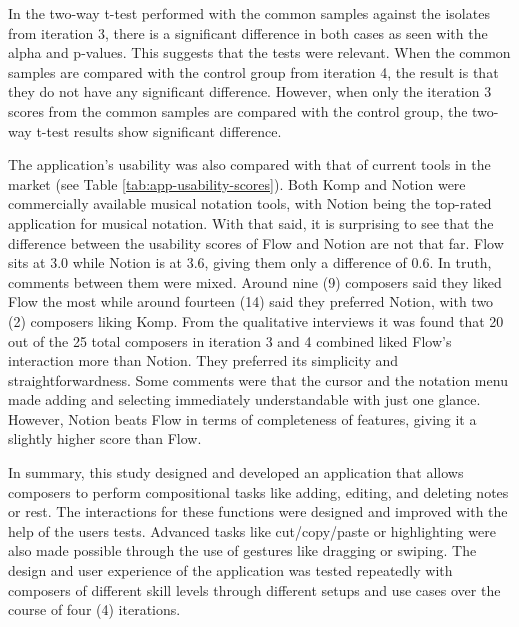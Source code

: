 		In the two-way t-test performed with the common samples against the isolates from iteration 3, there is a significant difference in both cases as seen with the alpha and p-values. This suggests that the tests were relevant. When the common samples are compared with the control group from iteration 4, the result is that they do not have any significant difference. However, when only the iteration 3 scores from the common samples are compared with the control group, the two-way t-test results show significant difference. 

		The application's usability was also compared with that of current tools in the market (see Table \ref{tab:app-usability-scores}). Both Komp and Notion were commercially available musical notation tools, with Notion being the top-rated application for musical notation. With that said, it is surprising to see that the difference between the usability scores of Flow and Notion are not that far. Flow sits at 3.0 while Notion is at 3.6, giving them only a difference of 0.6. In truth, comments between them were mixed. Around nine (9) composers said they liked Flow the most while around fourteen (14) said they preferred Notion, with two (2) composers liking Komp. From the qualitative interviews it was found that 20 out of the 25 total composers in iteration 3 and 4 combined liked Flow's interaction more than Notion. They preferred its simplicity and straightforwardness. Some comments were that the cursor and the notation menu made adding and selecting immediately understandable with just one glance. However, Notion beats Flow in terms of completeness of features, giving it a slightly higher score than Flow. 

		In summary, this study designed and developed an application that allows composers to perform compositional tasks like adding, editing, and deleting notes or rest. The interactions for these functions were designed and improved with the help of the users tests. Advanced tasks like cut/copy/paste or highlighting were also made possible through the use of gestures like dragging or swiping. The design and user experience of the application was tested repeatedly with composers of different skill levels through different setups and use cases over the course of four (4) iterations. 

